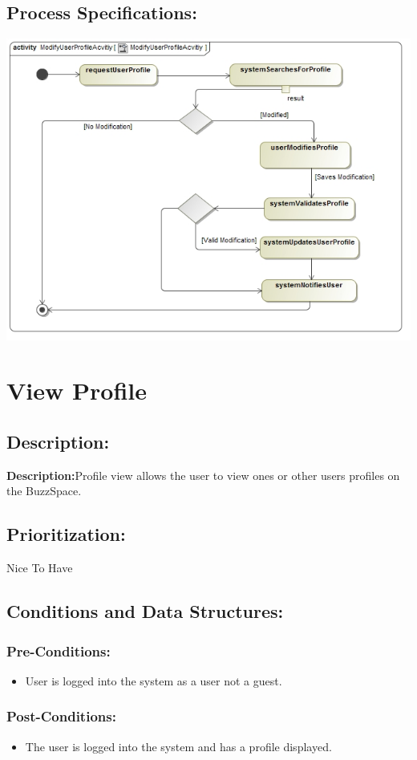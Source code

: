 \documentclass[a4paper,11pt]{article}
\begin{document}
\subsection{Process Specifications:} 
\includegraphics[width=1\linewidth]{./Images/UserProfile/ModifyUserProfileAcvitiy}


\section{View Profile}
\subsection*{Description:}
\textbf{Description:}Profile view allows the user to view ones or other users profiles on the BuzzSpace.
\subsection{Prioritization:} 
\textbf{}Nice To Have
\subsection{Conditions and Data Structures:}
\subsubsection*{Pre-Conditions:}
\begin{itemize}
\item User is logged into the system as a user not a guest. 
\end{itemize}
\subsubsection*{Post-Conditions:}
\begin{itemize}
\item The user is logged into the system and has a profile displayed.
\end{itemize}
\end{document}
